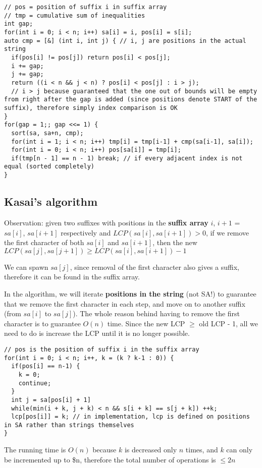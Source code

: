 \documentclass[11pt]{article}
\begin{document}
\begin{verbatim}
// pos = position of suffix i in suffix array
// tmp = cumulative sum of inequalities
int gap;
for(int i = 0; i < n; i++) sa[i] = i, pos[i] = s[i];
auto cmp = [&] (int i, int j) { // i, j are positions in the actual string
  if(pos[i] != pos[j]) return pos[i] < pos[j];
  i += gap;
  j += gap;
  return ((i < n && j < n) ? pos[i] < pos[j] : i > j);
  // i > j because guaranteed that the one out of bounds will be empty from right after the gap is added (since positions denote START of the suffix), therefore simply index comparison is OK
}
for(gap = 1;; gap <<= 1) {
  sort(sa, sa+n, cmp);
  for(int i = 1; i < n; i++) tmp[i] = tmp[i-1] + cmp(sa[i-1], sa[i]);
  for(int i = 0; i < n; i++) pos[sa[i]] = tmp[i];
  if(tmp[n - 1] == n - 1) break; // if every adjacent index is not equal (sorted completely)
}
\end{verbatim}

\subsection*{Kasai's algorithm}
\label{sec:orge979c4f}
Observation: given two suffixes with positions in the \textbf{\textbf{suffix array}} \(i\), \(i+1\) = \(sa[i]\), \(sa[i+1]\) respectively and \(LCP(sa[i], sa[i+1]) > 0\), if we remove the first character of both \(sa[i]\) and \(sa[i+1]\), then the new \(LCP(sa[j], sa[j+1]) \geq LCP(sa[i], sa[i+1]) - 1\)

We can spawn \(sa[j]\), since removal of the first character also gives a suffix, therefore it can be found in the suffix array.

In the algorithm, we will iterate \textbf{\textbf{positions in the string}} (not SA!) to guarantee that we remove the first character in each step, and move on to another suffix (from \(sa[i]\) to \(sa[j]\)). The whole reason behind having to remove the first character is to guarantee \(O(n)\) time. Since the new LCP \(\geq\) old LCP - 1, all we need to do is increase the LCP until it is no longer possible.

\begin{verbatim}
// pos is the position of suffix i in the suffix array
for(int i = 0; i < n; i++, k = (k ? k-1 : 0)) {
  if(pos[i] == n-1) {
    k = 0;
    continue;
  }
  int j = sa[pos[i] + 1]
  while(min(i + k, j + k) < n && s[i + k] == s[j + k]) ++k;
  lcp[pos[i]] = k; // in implementation, lcp is defined on positions in SA rather than strings themselves
}
\end{verbatim}

The running time is \(O(n)\) because \(k\) is decreased only \(n\) times, and \(k\) can only be incremented up to \$n, therefore the total number of operations is \(\leq 2n\)
\end{document}
